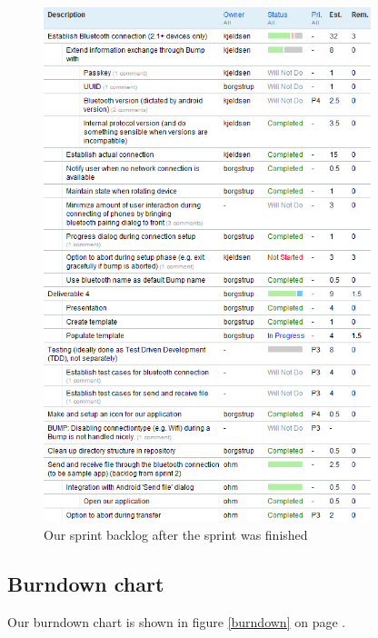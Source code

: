 \documentclass[a4paper,11pt]{article}
\begin{document}
\begin{figure}[ht!]
	\begin{center}
	\includegraphics[width=0.85\textwidth]{sprintbacklog.png}		
	\end{center}
	\caption{Our sprint backlog after the sprint was finished}
	\label{sprintbacklog}
\end{figure}

\subsection{Burndown chart}

Our burndown chart is shown in figure \ref{burndown} on page \pageref{burndown}.
\end{document}
